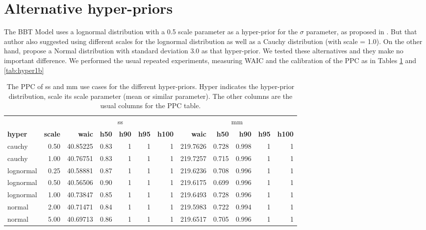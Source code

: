 \documentclass[twoside,11pt,preprint]{article}
\begin{document}
\appendix

\hypertarget{alternative-hyper-priors}{%
\section{\texorpdfstring{Alternative hyper-priors \label{test-hyper}}{Alternative hyper-priors }}\label{alternative-hyper-priors}}

The BBT Model uses a lognormal distribution with a 0.5 scale parameter
as a hyper-prior for the \(\sigma\) parameter, as proposed in \citet{btstan}. But
that author also suggested using different scales for the lognormal
distribution as well as a Cauchy distribution (with scale = 1.0). On
the other hand, \citet{issa2021bayesian} propose a Normal distribution with
standard deviation 3.0 as that hyper-prior. We tested these
alternatives and they make no important difference. We performed the
usual repeated experiments, measuring WAIC and the calibration of the
PPC as in Tables \ref{tab:hyper1} and \ref{tab:hyper1b}

\begin{table}

\caption{\label{tab:hyperxz1}\label{tab:hyper1}The PPC of ss and mm use cases for the different hyper-priors. Hyper indicates the hyper-prior distribution, scale its scale parameter (mean or similar parameter). The other columns are the usual columns for the PPC table.}
\centering
\begin{tabular}[t]{lrrrrrrrrrrr}
\toprule
\multicolumn{2}{c}{ } & \multicolumn{5}{c}{ss} & \multicolumn{5}{c}{mm} \\
\cmidrule(l{3pt}r{3pt}){3-7} \cmidrule(l{3pt}r{3pt}){8-12}
\textbf{\textbf{hyper}} & \textbf{\textbf{scale}} & \textbf{\textbf{waic}} & \textbf{\textbf{h50}} & \textbf{\textbf{h90}} & \textbf{\textbf{h95}} & \textbf{\textbf{h100}} & \textbf{\textbf{waic}} & \textbf{\textbf{h50}} & \textbf{\textbf{h90}} & \textbf{\textbf{h95}} & \textbf{\textbf{h100}}\\
\midrule
cauchy & 0.50 & 40.85225 & 0.83 & 1 & 1 & 1 & 219.7626 & 0.728 & 0.998 & 1 & 1\\
cauchy & 1.00 & 40.76751 & 0.83 & 1 & 1 & 1 & 219.7257 & 0.715 & 0.996 & 1 & 1\\
lognormal & 0.25 & 40.58881 & 0.87 & 1 & 1 & 1 & 219.6236 & 0.708 & 0.996 & 1 & 1\\
lognormal & 0.50 & 40.56506 & 0.90 & 1 & 1 & 1 & 219.6175 & 0.699 & 0.996 & 1 & 1\\
lognormal & 1.00 & 40.73847 & 0.85 & 1 & 1 & 1 & 219.6493 & 0.728 & 0.996 & 1 & 1\\
\addlinespace
normal & 2.00 & 40.71471 & 0.84 & 1 & 1 & 1 & 219.5983 & 0.722 & 0.994 & 1 & 1\\
normal & 5.00 & 40.69713 & 0.86 & 1 & 1 & 1 & 219.6517 & 0.705 & 0.996 & 1 & 1\\
\bottomrule
\end{tabular}
\end{table}
\end{document}
